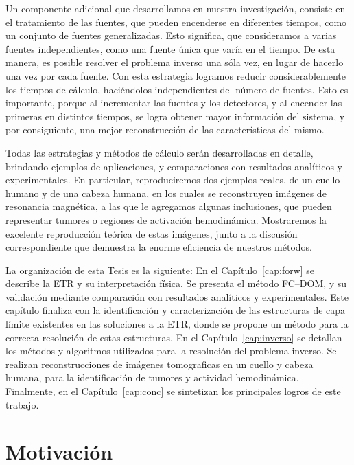 Un componente adicional que desarrollamos en nuestra investigación, 
consiste en el tratamiento de las fuentes, que pueden encenderse 
en diferentes tiempos, como un conjunto de fuentes generalizadas. 
Esto significa, que consideramos a varias fuentes independientes, 
como una fuente única que varía en el tiempo. 
De esta manera, es posible resolver el problema 
inverso una sóla vez, en lugar de hacerlo una vez por cada fuente. 
Con esta estrategia logramos reducir considerablemente los tiempos de 
cálculo, haciéndolos independientes del número de fuentes. 
Esto es importante, porque al incrementar las fuentes y los 
detectores, y al encender las primeras en distintos tiempos, 
se logra obtener mayor información del sistema, y por consiguiente, 
una mejor reconstrucción de las características del mismo.

Todas las estrategias y métodos de cálculo serán desarrolladas 
en detalle, brindando ejemplos de aplicaciones, y comparaciones 
con resultados analíticos y experimentales. 
En particular, reproduciremos dos ejemplos reales, de un cuello 
humano y de una cabeza humana, en los 
cuales se reconstruyen imágenes de resonancia magnética, a las 
que le agregamos algunas inclusiones, que pueden representar 
tumores o regiones de activación hemodinámica.
Mostraremos la excelente reproducción teórica de estas imágenes, 
junto a la discusión correspondiente que demuestra la enorme 
eficiencia de nuestros métodos.

La organización de esta Tesis es la siguiente: 
En el Capítulo~\ref{cap:forw} se describe la ETR y su interpretación 
física. Se presenta el método FC--DOM, y su validación mediante 
comparación con resultados analíticos y experimentales. 
Este capítulo finaliza con la identificación y 
caracterización de las estructuras de capa límite existentes 
en las soluciones a la ETR, donde se propone un método para 
la correcta resolución de estas estructuras. 
 En el Capítulo~\ref{cap:inverso}  se detallan los métodos 
y algoritmos utilizados para la resolución del problema inverso. 
Se realizan reconstrucciones de imágenes tomograficas en un cuello 
y cabeza humana, para la identificación de tumores y actividad hemodinámica. 
Finalmente, en el Capítulo~\ref{cap:conc} se sintetizan los principales 
logros de este trabajo.


\bigskip
\section{Motivación}

